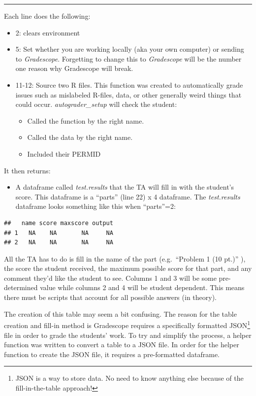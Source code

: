 \documentclass[
]{article}
\providecommand{\tightlist}{%
  \setlength{\itemsep}{0pt}\setlength{\parskip}{0pt}}
\begin{document}
\begin{center}\rule{0.5\linewidth}{0.5pt}\end{center}

Each line does the following:

\begin{itemize}
\item
  2: clears environment
\item
  5: Set whether you are working locally (aka your own computer) or
  sending to \emph{Gradescope}. Forgetting to change this to
  \emph{Gradescope} will be the number one reason why Gradescope will
  break.
\item
  11-12: Source two R files. This function was created to automatically
  grade issues such as mislabeled R-files, data, or other generally
  weird things that could occur. \emph{autograder\_setup} will check the
  student:

  \begin{itemize}
  \item
    Called the function by the right name.
  \item
    Called the data by the right name.
  \item
    Included their PERMID
  \end{itemize}
\end{itemize}

It then returns:

\begin{itemize}
\tightlist
\item
  A dataframe called \emph{test.results} that the TA will fill in with
  the student's score. This dataframe is a ``parts'' (line 22) x 4
  dataframe. The \emph{test.results} dataframe looks something like this
  when ``parts''=2:
\end{itemize}

\begin{verbatim}
##   name score maxscore output
## 1   NA    NA       NA     NA
## 2   NA    NA       NA     NA
\end{verbatim}

All the TA has to do is fill in the name of the part (e.g.~``Problem 1
(10 pt.)'' ), the score the student received, the maximum possible score
for that part, and any comment they'd like the student to see. Columns 1
and 3 will be some pre-determined value while columns 2 and 4 will be
student dependent. This means there must be scripts that account for all
possible answers (in theory).

The creation of this table may seem a bit confusing. The reason for the
table creation and fill-in method is Gradescope requires a specifically
formatted JSON\footnote{JSON is a way to store data. No need to know
  anything else because of the fill-in-the-table approach!} file in
order to grade the students' work. To try and simplify the process, a
helper function was written to convert a table to a JSON file. In order
for the helper function to create the JSON file, it requires a
pre-formatted dataframe.
\end{document}
